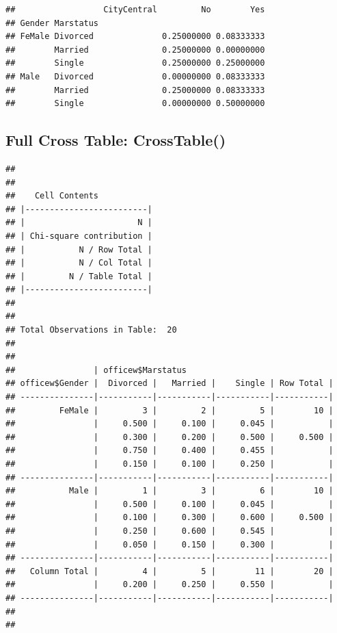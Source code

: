 \documentclass[
]{article}
\newenvironment{Shaded}{\begin{snugshade}}{\end{snugshade}}
\newcommand{\CommentTok}[1]{\textcolor[rgb]{0.56,0.35,0.01}{\textit{#1}}}
\newcommand{\FunctionTok}[1]{\textcolor[rgb]{0.13,0.29,0.53}{\textbf{#1}}}
\newcommand{\NormalTok}[1]{#1}
\newcommand{\SpecialCharTok}[1]{\textcolor[rgb]{0.81,0.36,0.00}{\textbf{#1}}}
\begin{document}
\begin{verbatim}
##                  CityCentral         No        Yes
## Gender Marstatus                                  
## FeMale Divorced              0.25000000 0.08333333
##        Married               0.25000000 0.00000000
##        Single                0.25000000 0.25000000
## Male   Divorced              0.00000000 0.08333333
##        Married               0.25000000 0.08333333
##        Single                0.00000000 0.50000000
\end{verbatim}

\hypertarget{full-cross-table-crosstable}{%
\subsection{Full Cross Table:
CrossTable()}\label{full-cross-table-crosstable}}

\begin{Shaded}
\end{Shaded}

\begin{verbatim}
## 
##  
##    Cell Contents
## |-------------------------|
## |                       N |
## | Chi-square contribution |
## |           N / Row Total |
## |           N / Col Total |
## |         N / Table Total |
## |-------------------------|
## 
##  
## Total Observations in Table:  20 
## 
##  
##                | officew$Marstatus 
## officew$Gender |  Divorced |   Married |    Single | Row Total | 
## ---------------|-----------|-----------|-----------|-----------|
##         FeMale |         3 |         2 |         5 |        10 | 
##                |     0.500 |     0.100 |     0.045 |           | 
##                |     0.300 |     0.200 |     0.500 |     0.500 | 
##                |     0.750 |     0.400 |     0.455 |           | 
##                |     0.150 |     0.100 |     0.250 |           | 
## ---------------|-----------|-----------|-----------|-----------|
##           Male |         1 |         3 |         6 |        10 | 
##                |     0.500 |     0.100 |     0.045 |           | 
##                |     0.100 |     0.300 |     0.600 |     0.500 | 
##                |     0.250 |     0.600 |     0.545 |           | 
##                |     0.050 |     0.150 |     0.300 |           | 
## ---------------|-----------|-----------|-----------|-----------|
##   Column Total |         4 |         5 |        11 |        20 | 
##                |     0.200 |     0.250 |     0.550 |           | 
## ---------------|-----------|-----------|-----------|-----------|
## 
## 
\end{verbatim}
\end{document}
